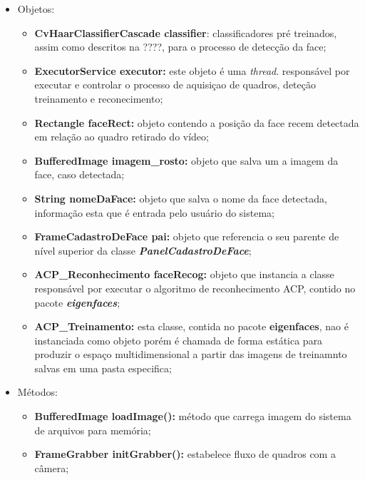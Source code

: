 \begin{itemize}
	\item Objetos:
	\begin{itemize}
		\item \textbf{CvHaarClassifierCascade classifier}: classificadores pré treinados, assim como descritos na ????, para o processo de detecção da face;
		
		\item \textbf{ExecutorService executor:} este objeto é uma \textit{thread}. responsável por executar e controlar o processo de aquisiçao de quadros, deteção treinamento e reconecimento;
		
		\item \textbf{Rectangle faceRect:} objeto contendo a posição da face recem detectada em relação ao quadro retirado do vídeo;
		
		\item \textbf{BufferedImage imagem\_rosto:} objeto que salva um a imagem da face, caso detectada;
		
		\item \textbf{String nomeDaFace:} objeto que salva o nome da face detectada, informação esta que é entrada pelo usuário do sistema;
		
		\item \textbf{FrameCadastroDeFace pai:} objeto que referencia o seu parente de nível superior da classe \textbf{\textit{PanelCadastroDeFace}};
		
		\item \textbf{ACP\_Reconhecimento faceRecog:} objeto que instancia a classe responsável por executar o algoritmo de reconhecimento ACP, contido no pacote \textbf{\textit{eigenfaces}};
		
		\item \textbf{ACP\_Treinamento:} esta classe, contida no pacote \textbf{eigenfaces}, nao é instanciada como objeto porém é chamada de forma estática para produzir o espaço multidimensional a partir das imagens de treinamnto salvas em uma pasta especifica;
		
	\end{itemize}
	
	\item Métodos:
	\begin{itemize}
		\item \textbf{BufferedImage loadImage():} método que carrega imagem do sistema de arquivos para memória;
		
		\item \textbf{FrameGrabber initGrabber():} estabelece fluxo de quadros com a câmera;
		

\end{itemize}
\end{itemize}
